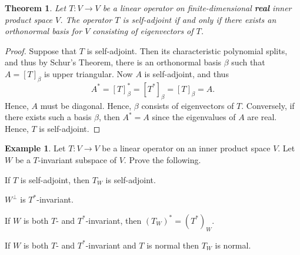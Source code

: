 \documentclass[12pt]{article}
\newcommand{\tv}{T:V\rightarrow V}
\newtheorem{theorem}{Theorem}[section]
\theoremstyle{definition}
\newtheorem{example}{Example}[section]
\begin{document}
\begin{theorem}
Let $\tv$ be a linear operator on finite-dimensional \textbf{real} inner product space $V$.  The operator $T$ is self-adjoint if and only if there exists an orthonormal basis for $V$ consisting of eigenvectors of $T$.
\end{theorem}
\begin{proof}
Suppose that $T$ is self-adjoint.  Then its characteristic polynomial splits, and thus by Schur's Theorem, there is an orthonormal basis $\beta$ such that $A=[T]_\beta$ is upper triangular.  Now $A$ is self-adjoint, and thus   
\[
A^* = [T]_\beta^* = [T^*]_\beta = [T]_\beta = A.
\]
Hence, $A$ must be diagonal.  Hence, $\beta$ consists of eigenvectors of $T$.  Conversely, if there exists such a basis $\beta$, then $A^*=A$ since the eigenvalues of $A$ are real.  Hence, $T$ is self-adjoint.
\end{proof}

\begin{example}
Let $\tv$ be a linear operator on an inner product space $V$.  Let $W$ be a $T$-invariant subspace of $V$.  Prove the following.
\begin{compactenum}[(a)]
\item If $T$ is self-adjoint, then $T_W$ is self-adjoint.
\item $W^\perp$ is $T^*$-invariant.
\item If $W$ is both $T$- and $T^*$-invariant, then $(T_W)^*=(T^*)_W$.
\item If $W$ is both $T$- and $T^*$-invariant and $T$ is normal then $T_W$ is normal.
\end{compactenum}
\end{example}
\end{document}
